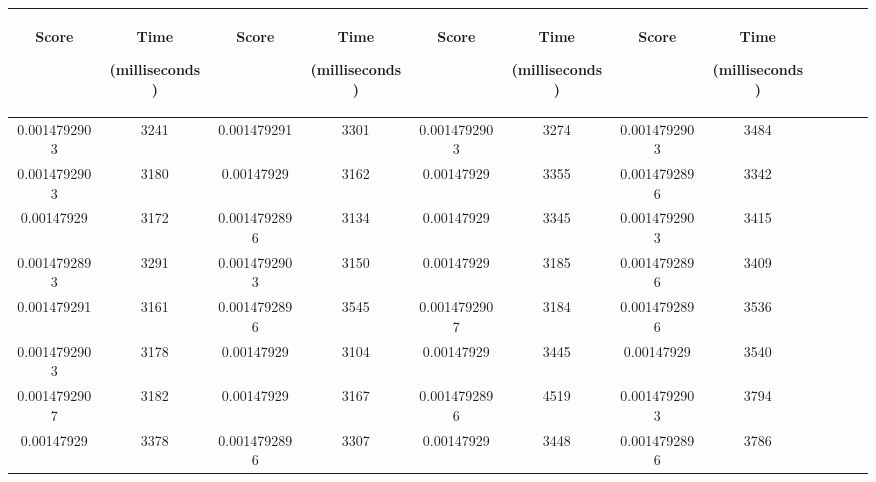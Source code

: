 \begin{table}[h]
  \centering
  \begin{tabular}{|c|c|c|c|c|c|c|c|c|c|c|c|} 
  \midrule
 \begin{sideways}Score\end{sideways}& \begin{sideways}Time\end{sideways} \begin{sideways} (milliseconds)\end{sideways}& \begin{sideways}Score\end{sideways}& \begin{sideways}Time\end{sideways}  \begin{sideways}(milliseconds)\end{sideways}& \begin{sideways}Score\end{sideways}& \begin{sideways}Time\end{sideways}  \begin{sideways}(milliseconds)\end{sideways}& \begin{sideways}Score\end{sideways}& \begin{sideways}Time\end{sideways}  \begin{sideways} (milliseconds)\end{sideways}\\
\midrule
0.0014792903&3241&0.001479291&3301&0.0014792903&3274&0.0014792903&3484\\
\midrule
0.0014792903&3180&0.00147929&3162&0.00147929&3355&0.0014792896&3342\\
\midrule
0.00147929&3172&0.0014792896&3134&0.00147929&3345&0.0014792903&3415\\
\midrule
0.0014792893&3291&0.0014792903&3150&0.00147929&3185&0.0014792896&3409\\
\midrule
0.001479291&3161&0.0014792896&3545&0.0014792907&3184&0.0014792896&3536\\
\midrule
0.0014792903&3178&0.00147929&3104&0.00147929&3445&0.00147929&3540\\
\midrule
0.0014792907&3182&0.00147929&3167&0.0014792896&4519&0.0014792903&3794\\
\midrule
0.00147929&3378&0.0014792896&3307&0.00147929&3448&0.0014792896&3786\\

\end{tabular}
\end{table}
